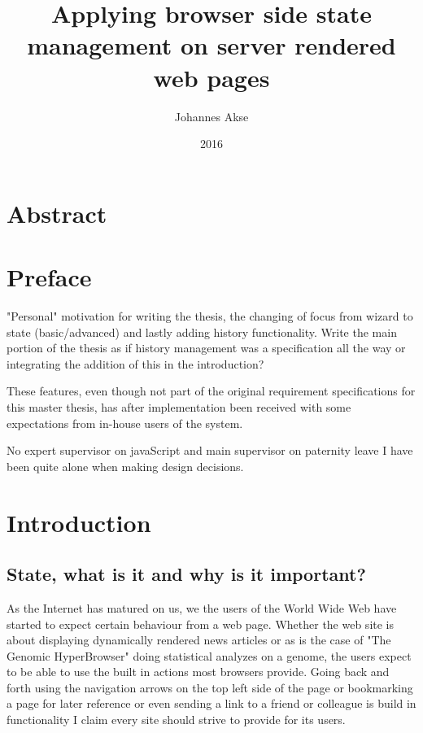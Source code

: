 \documentclass[english]{ifimaster}
\title{Applying browser side state management on server rendered web pages}
\subtitle{}
\author{Johannes Akse}
\date{2016}
\begin{document}
\maketitle{}
\chapter*{Abstract}
\tableofcontents
\nocite{*}

\chapter*{Preface}
"Personal" motivation for writing the thesis, the changing of focus from wizard to state (basic/advanced) and lastly adding history functionality. Write the main portion of the thesis as if history management was a specification all the way or integrating the addition of this in the introduction?

These features, even though not part of the original requirement specifications for this master thesis, has after implementation been received with some expectations from in-house users of the system. 

No expert supervisor on javaScript and main supervisor on paternity leave I have been quite alone when making design decisions.  

\chapter{Introduction}
\section{State, what is it and why is it important?}
As the Internet has matured on us, we the users of the World Wide Web have started to expect certain behaviour from a web page\parencite[p.85]{mik}. Whether the web site is about displaying dynamically rendered news articles or as is the case of "The Genomic HyperBrowser" doing statistical analyzes on a genome, the users expect to be able to use the built in actions most browsers provide. Going back and forth using the navigation arrows on the top left side of the page or bookmarking a page for later reference or even sending a link to a friend or colleague is build in functionality I claim every site should strive to provide for its users. 
\end{document}
